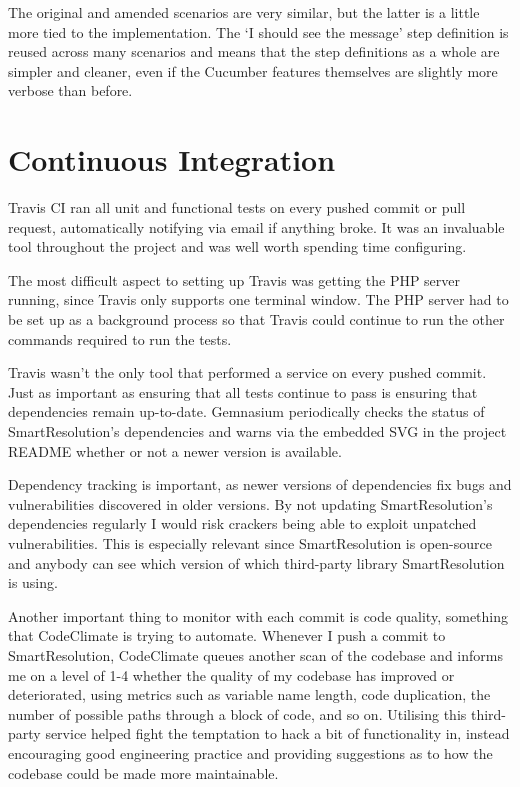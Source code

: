 The original and amended scenarios are very similar, but the latter is a little more tied to the implementation. The `I should see the message' step definition is reused across many scenarios and means that the step definitions as a whole are simpler and cleaner, even if the Cucumber features themselves are slightly more verbose than before.

\section{Continuous Integration}

Travis CI ran all unit and functional tests on every pushed commit or pull request, automatically notifying via email if anything broke. It was an invaluable tool throughout the project and was well worth spending time configuring.

The most difficult aspect to setting up Travis was getting the PHP server running, since Travis only supports one terminal window. The PHP server had to be set up as a background process so that Travis could continue to run the other commands required to run the tests.

Travis wasn't the only tool that performed a service on every pushed commit. Just as important as ensuring that all tests continue to pass is ensuring that dependencies remain up-to-date. Gemnasium periodically checks the status of SmartResolution's dependencies and warns via the embedded SVG in the project README whether or not a newer version is available.

Dependency tracking is important, as newer versions of dependencies fix bugs and vulnerabilities discovered in older versions. By not updating SmartResolution's dependencies regularly I would risk crackers being able to exploit unpatched vulnerabilities. This is especially relevant since SmartResolution is open-source and anybody can see which version of which third-party library SmartResolution is using.

Another important thing to monitor with each commit is code quality, something that CodeClimate is trying to automate. Whenever I push a commit to SmartResolution, CodeClimate queues another scan of the codebase and informs me on a level of 1-4 whether the quality of my codebase has improved or deteriorated, using metrics such as variable name length, code duplication, the number of possible paths through a block of code, and so on. Utilising this third-party service helped fight the temptation to hack a bit of functionality in, instead encouraging good engineering practice and providing suggestions as to how the codebase could be made more maintainable.

